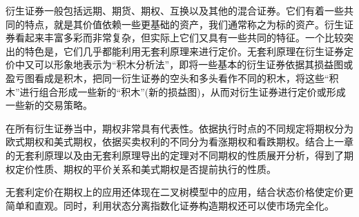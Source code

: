 

\begin{tcolorbox}[summary,title=本章小结]
衍生证券一般包括远期、期货、期权、互换以及其他的混合证券。它们有着一些共同的特点，就是其价值依赖一些更基础的资产，我们通常称之为标的资产。衍生证券看起来丰富多彩而非常复杂，但实际上它们又具有一些共同的特征。一个比较突出的特色是，它们几乎都能利用无套利原理来进行定价。无套利原理在衍生证券定价中又可以形象地表示为“积木分析法”，即将一些基本的衍生证券依据其损益图或盈亏图看成是积木，把同一衍生证券的空头和多头看作不同的积木，将这些“积木”进行组合形成一些新的“积木”(新的损益图)，从而对衍生证券进行定价或形成一些新的交易策略。

在所有衍生证券当中，期权非常具有代表性。依据执行时点的不同规定将期权分为欧式期权和美式期权，依据买卖权利的不同分为看涨期权和看跌期权。结合上一章的无套利原理以及由无套利原理导出的定理对不同期权的性质展开分析，得到了期权定价性质、期权的平价关系和美式期权是否提前执行的性质。

无套利定价在期权上的应用还体现在二叉树模型中的应用，结合状态价格使定价更简单和直观。同时，利用状态分离指数化证券构造期权还可以使市场完全化。
\end{tcolorbox}



